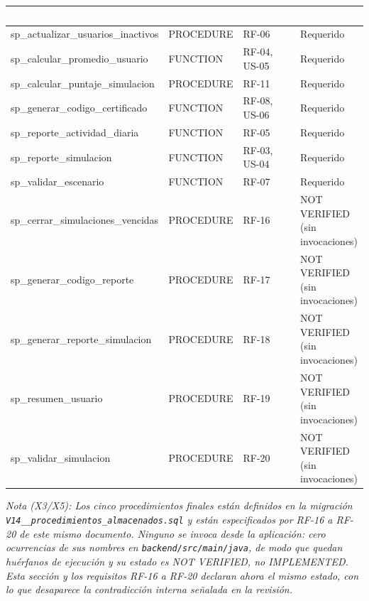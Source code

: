 \documentclass[11pt,a4paper]{article}
\begin{document}
\begin{table}[h]
    \centering
    \renewcommand{\arraystretch}{1.3}
    \begin{tabularx}{\textwidth}{@{}|l|l|X|l|@{}}
        \hline
        \rowcolor{uteqblue}
        \textcolor{white}{\textbf{Nombre en V14}} & \textcolor{white}{\textbf{Tipo}} & \textcolor{white}{\textbf{Requisito}} & \textcolor{white}{\textbf{Estado}} \\ \hline
        sp\_actualizar\_usuarios\_inactivos & PROCEDURE & RF-06 & Requerido \\ \hline
        sp\_calcular\_promedio\_usuario & FUNCTION & RF-04, US-05 & Requerido \\ \hline
        sp\_calcular\_puntaje\_simulacion & PROCEDURE & RF-11 & Requerido \\ \hline
        sp\_generar\_codigo\_certificado & FUNCTION & RF-08, US-06 & Requerido \\ \hline
        sp\_reporte\_actividad\_diaria & FUNCTION & RF-05 & Requerido \\ \hline
        sp\_reporte\_simulacion & FUNCTION & RF-03, US-04 & Requerido \\ \hline
        sp\_validar\_escenario & FUNCTION & RF-07 & Requerido \\ \hline
        sp\_cerrar\_simulaciones\_vencidas & PROCEDURE & RF-16 & NOT VERIFIED (sin invocaciones) \\ \hline
        sp\_generar\_codigo\_reporte & PROCEDURE & RF-17 & NOT VERIFIED (sin invocaciones) \\ \hline
        sp\_generar\_reporte\_simulacion & PROCEDURE & RF-18 & NOT VERIFIED (sin invocaciones) \\ \hline
        sp\_resumen\_usuario & PROCEDURE & RF-19 & NOT VERIFIED (sin invocaciones) \\ \hline
        sp\_validar\_simulacion & PROCEDURE & RF-20 & NOT VERIFIED (sin invocaciones) \\ \hline
    \end{tabularx}
\end{table}

\textit{Nota (X3/X5): Los cinco procedimientos finales están definidos en la migración \texttt{V14\_\_procedimientos\_almacenados.sql} y están especificados por RF-16 a RF-20 de este mismo documento. Ninguno se invoca desde la aplicación: cero ocurrencias de sus nombres en \texttt{backend/src/main/java}, de modo que quedan huérfanos de ejecución y su estado es NOT VERIFIED, no IMPLEMENTED. Esta sección y los requisitos RF-16 a RF-20 declaran ahora el mismo estado, con lo que desaparece la contradicción interna señalada en la revisión.}
\end{document}
